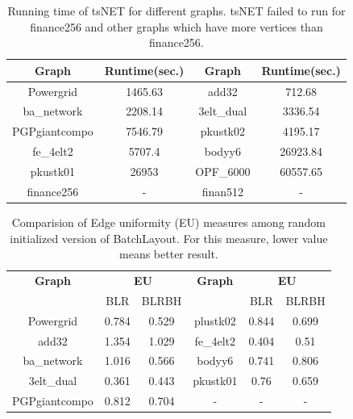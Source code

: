 \documentclass[conference]{article}
\newcommand{\toolname}{{BatchLayout}}
\begin{document}
\begin{table}%
\caption{Running time of tsNET for different graphs. tsNET failed to run for finance256 and other graphs which have more vertices than finance256.}

\centering
\begin{tabular}{|c|c|c|c|}
\hline
\textbf{Graph} & \textbf{Runtime(sec.)} & \textbf{Graph} & \textbf{Runtime(sec.)} \\ \hline

Powergrid &	1465.63	 &	add32 &	712.68	\\ \hline
ba\_network  &	2208.14 &	3elt\_dual & 3336.54 \\ \hline	PGPgiantcompo &	7546.79 & pkustk02 &	4195.17 \\ \hline
fe\_4elt2 &	5707.4	&		bodyy6 &	26923.84 \\ \hline	pkustk01 &		26953 &	OPF\_6000 &		60557.65 \\ \hline finance256  & - &		finan512 & -\\ \hline
\end{tabular}
\label{tab:measures_tsnet_time}
\end{table}



\begin{table}%
\caption{Comparision of Edge uniformity (EU) measures among random initialized version of \toolname{}. For this measure, lower value means better result.}

\centering
\begin{tabular}{|c|c|c|c|c|c|}
\hline
\multirow{1}{*}{\textbf{Graph}} & \multicolumn{2}{c|}{\textbf{EU}}  &  \multirow{1}{*}{\textbf{Graph}}
& \multicolumn{2}{c|}{\textbf{EU}}            \\ \cline{2-3} \cline{5-6}
                                & BLR       & BLRBH & & BLR & BLRBH  \\ \hline

Powergrid &		0.784 &		0.529 & plustk02	& 	0.844 &		0.699\\ \hline
add32 &	1.354 &		1.029 &	 fe\_4elt2 &		0.404 &		0.51\\ \hline
ba\_network	 &	1.016 &		0.566 & bodyy6 &	0.741 &		0.806 \\ \hline
3elt\_dual &		0.361 &		0.443 &	pkustk01 &	0.76 &		0.659\\ \hline
PGPgiantcompo &	0.812 &		0.704 & - &		- &	-\\ \hline

\end{tabular}
\label{tab:measures_random_init0}
\end{table}
\end{document}
